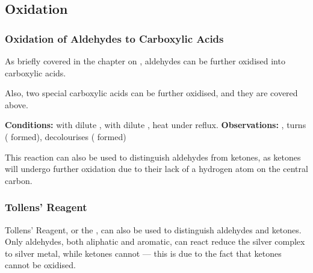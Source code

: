 

		\subsection{Oxidation}

			\subsubsection{Oxidation of Aldehydes to Carboxylic Acids}

				As briefly covered in the chapter on \hyperlink{CompleteOxidationOfPrimaryAlcohols}{}, aldehydes can be
				further oxidised into carboxylic acids.

				Also, two special carboxylic acids can be further oxidised, and they are covered above.

				\vspace{1.5em}
				\vbox{\textbf{Conditions:}	\tabto{35mm} with dilute ,   with dilute ,
											\tabto{35mm}heat under reflux.}
				\vspace{0.75em}
				\vbox{\textbf{Observations:}\tabto{35mm} , turns 
														( formed), 
											\tabto{35mm}  decolourises ( formed)}


				This reaction can also be used to distinguish aldehydes from ketones, as ketones will  undergo further oxidation
				due to their lack of a hydrogen atom on the central carbon.


			\subsubsection{Tollens' Reagent}

				Tollens' Reagent, or the , can also be used to distinguish aldehydes and ketones. Only aldehydes,
				both aliphatic and aromatic, can react reduce the silver complex to silver metal, while ketones cannot --- this is due to the
				fact that ketones cannot be oxidised.

